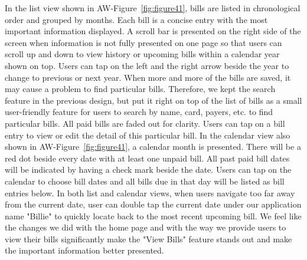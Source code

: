 \documentclass{sigchi}
\begin{document}
In the list view shown in AW-Figure~\ref{fig:figure41}, bills are listed in chronological order and grouped by months. Each bill is a concise entry with the most important information displayed. A scroll bar is presented on the right side of the screen when information is not fully presented on one page so that users can scroll up and down to view history or upcoming bills within a calendar year shown on top. Users can tap on the left and the right arrow beside the year to change to previous or next year. When more and more of the bills are saved, it may cause a problem to find particular bills. Therefore, we kept the search feature in the previous design, but put it right on top of the list of bills as a small user-friendly feature for users to search by name, card, payers, etc. to find particular bills. All paid bills are faded out for clarity. Users can tap on a bill entry to view or edit the detail of this particular bill. In the calendar view also shown in AW-Figure~\ref{fig:figure41}, a calendar month is presented. There will be a red dot beside every date with at least one unpaid bill. All past paid bill dates will be indicated by having a check mark beside the date. Users can tap on the calendar to choose bill dates and all bills due in that day will be listed as bill entries below. In both list and calendar views, when users navigate too far away from the current date, user can double tap the current date under our application name "Billie" to quickly locate back to the most recent upcoming bill. We feel like the changes we did with the home page and with the way we provide users to view their bills significantly make the "View Bills" feature stands out and make the important information better presented.
\end{document}
